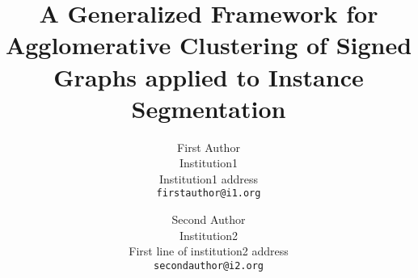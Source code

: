 \documentclass[10pt,twocolumn,letterpaper]{article}
\begin{document}
\title{A Generalized Framework for Agglomerative Clustering of Signed Graphs 
applied to Instance Segmentation}

\author{First Author\\
Institution1\\
Institution1 address\\
{\tt\small firstauthor@i1.org}
\and
Second Author\\
Institution2\\
First line of institution2 address\\
{\tt\small secondauthor@i2.org}
}





\maketitle












{\small


}
\clearpage

\end{document}
